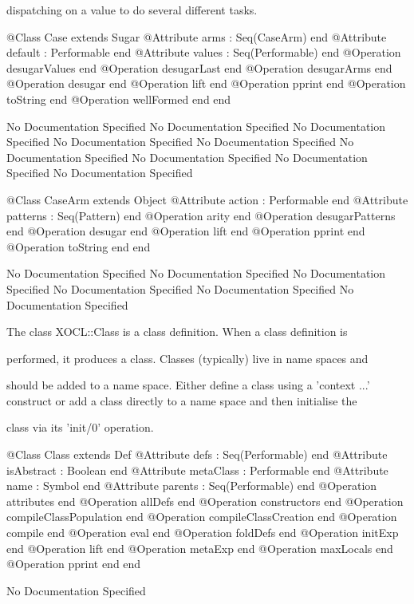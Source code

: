       dispatching on a value to do several different tasks.
\begin{Interface}
@Class Case extends Sugar
  @Attribute arms : Seq(CaseArm) end
  @Attribute default : Performable end
  @Attribute values : Seq(Performable) end
  @Operation desugarValues end
  @Operation desugarLast end
  @Operation desugarArms end
  @Operation desugar end
  @Operation lift end
  @Operation pprint end
  @Operation toString end
  @Operation wellFormed end
end
\end{Interface}
No Documentation Specified
No Documentation Specified
No Documentation Specified
No Documentation Specified
No Documentation Specified
No Documentation Specified
No Documentation Specified
No Documentation Specified
No Documentation Specified
\begin{Interface}
@Class CaseArm extends Object
  @Attribute action : Performable end
  @Attribute patterns : Seq(Pattern) end
  @Operation arity end
  @Operation desugarPatterns end
  @Operation desugar end
  @Operation lift end
  @Operation pprint end
  @Operation toString end
end
\end{Interface}
No Documentation Specified
No Documentation Specified
No Documentation Specified
No Documentation Specified
No Documentation Specified
No Documentation Specified

      The class XOCL::Class is a class definition. When a class definition is

      performed, it produces a class. Classes (typically) live in name spaces and

      should be added to a name space. Either define a class using a 'context ...'
      construct or add a class directly to a name space and then initialise the

      class via its 'init/0' operation.
\begin{Interface}
@Class Class extends Def
  @Attribute defs : Seq(Performable) end
  @Attribute isAbstract : Boolean end
  @Attribute metaClass : Performable end
  @Attribute name : Symbol end
  @Attribute parents : Seq(Performable) end
  @Operation attributes end
  @Operation allDefs end
  @Operation constructors end
  @Operation compileClassPopulation end
  @Operation compileClassCreation end
  @Operation compile end
  @Operation eval end
  @Operation foldDefs end
  @Operation initExp end
  @Operation lift end
  @Operation metaExp end
  @Operation maxLocals end
  @Operation pprint end
end
\end{Interface}
No Documentation Specified

